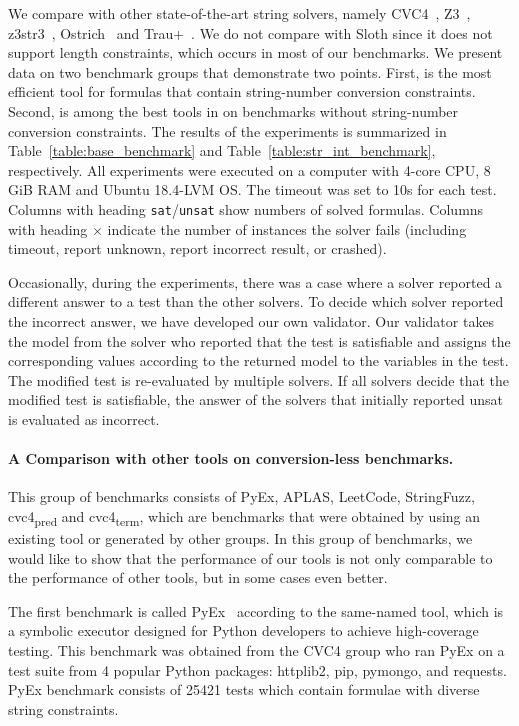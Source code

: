 We compare {\tool }with other state-of-the-art string solvers, namely CVC4~\cite{cvc4Tool}, Z3~\cite{z3}, \textsf{z3str3}~\cite{zheng2013z3}, Ostrich~\cite{chen2019decision} and \textsf{Trau+}~\cite{parosh2019chain}. We do not compare with Sloth \cite{sloth} since it does not support length constraints, which occurs in most of our benchmarks. We present data on two benchmark groups that demonstrate two points. First, {\tool} is the most efficient tool for formulas that contain string-number conversion constraints. Second, {\tool} is among the best tools in on benchmarks without string-number conversion constraints.
The results of the experiments is summarized in Table~\ref{table:base_benchmark} and Table~\ref{table:str_int_benchmark}, respectively. All experiments were executed on a computer with 4-core CPU, 8 GiB RAM and Ubuntu 18.4-LVM OS. The timeout was set to 10s for each test. Columns with heading \texttt{sat}/\texttt{unsat} show numbers of solved formulas. Columns with heading $\times$ indicate the number of instances the solver fails (including timeout, report unknown, report incorrect result, or crashed).

Occasionally, during the experiments, there was a case where a solver reported a different answer to a test than the other solvers. To decide which solver reported the incorrect answer, we have developed our own validator. Our validator takes the model from the solver who reported that the test is satisfiable and assigns the corresponding values according to the returned model to the variables in the test. The modified test is re-evaluated by multiple solvers. If all solvers decide that the modified test is satisfiable, the answer of the solvers that initially reported unsat is evaluated as incorrect.

\paragraph{A Comparison with other tools on conversion-less benchmarks.}
This group of benchmarks consists of PyEx, APLAS, LeetCode, StringFuzz, cvc4\textsubscript{pred} and cvc4\textsubscript{term}, which are benchmarks that were obtained by using an existing tool or generated by other groups. In this group of benchmarks, we would like to show that the performance of our tools is not only comparable to the performance of other tools, but in some cases even better.

The first benchmark is called PyEx~\cite{pyex} according to the same-named tool, which is a symbolic executor designed for Python developers to achieve high-coverage testing. This benchmark was obtained from the CVC4 group who ran PyEx on a test suite from 4 popular Python packages: httplib2, pip, pymongo, and requests. PyEx benchmark consists of 25421 tests which contain formulae with diverse string constraints.

